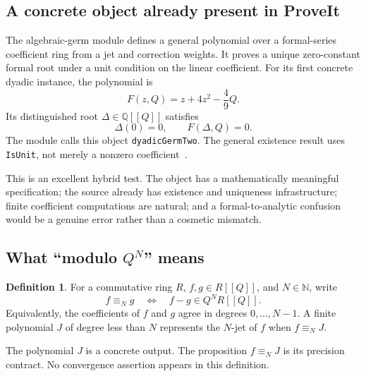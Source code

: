 \documentclass[11pt,letterpaper]{article}
\newcommand{\code}[1]{\nolinkurl{#1}}
\newcommand{\N}{\mathbb N}
\newcommand{\Q}{\mathbb Q}
\theoremstyle{definition}
\newtheorem{definition}[theorem]{Definition}
\theoremstyle{remark}
\begin{document}
\subsection{A concrete object already present in ProveIt}
The algebraic-germ module defines a general polynomial over a formal-series
coefficient ring from a jet and correction weights. It proves a unique
zero-constant formal root under a unit condition on the linear coefficient.
For its first concrete dyadic instance, the polynomial is
\begin{equation}
 F(z,Q)=z+4z^2-\frac49Q.
 \label{eq:germ-poly}
\end{equation}
Its distinguished root $\Delta\in\Q[[Q]]$ satisfies
\begin{equation}
 \Delta(0)=0,\qquad F(\Delta,Q)=0.
 \label{eq:germ-root}
\end{equation}
The module calls this object \code{dyadicGermTwo}. The general existence result
uses \code{IsUnit}, not merely a nonzero coefficient~\cite{p-germ}.

This is an excellent hybrid test. The object has a mathematically meaningful
specification; the source already has existence and uniqueness infrastructure;
finite coefficient computations are natural; and a formal-to-analytic confusion
would be a genuine error rather than a cosmetic mismatch.

\subsection{What ``modulo $Q^N$'' means}
\begin{definition}
For a commutative ring $R$, $f,g\in R[[Q]]$, and $N\in\N$, write
\[
 f\equiv_N g\quad\Longleftrightarrow\quad f-g\in Q^N R[[Q]].
\]
Equivalently, the coefficients of $f$ and $g$ agree in degrees $0,\ldots,N-1$.
A finite polynomial $J$ of degree less than $N$ represents the $N$-jet of $f$
when $f\equiv_N J$.
\end{definition}
The polynomial $J$ is a concrete output. The proposition $f\equiv_N J$ is its
precision contract. No convergence assertion appears in this definition.
\end{document}
